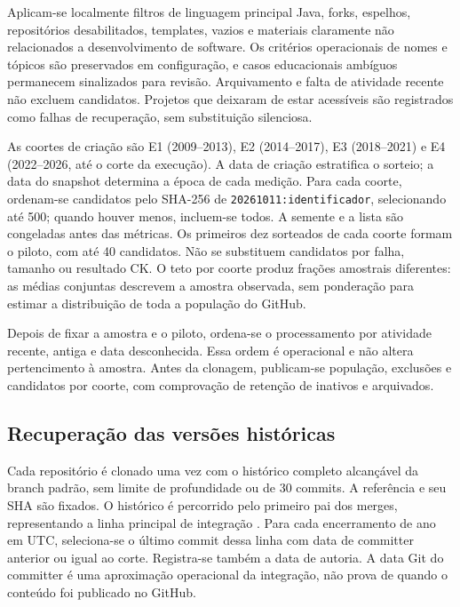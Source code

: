 Aplicam-se localmente filtros de linguagem principal Java, forks, espelhos, repositórios desabilitados, templates, vazios e materiais claramente não relacionados a desenvolvimento de software. Os critérios operacionais de nomes e tópicos são preservados em configuração, e casos educacionais ambíguos permanecem sinalizados para revisão. Arquivamento e falta de atividade recente não excluem candidatos. Projetos que deixaram de estar acessíveis são registrados como falhas de recuperação, sem substituição silenciosa.

As coortes de criação são E1 (2009--2013), E2 (2014--2017), E3 (2018--2021) e E4 (2022--2026, até o corte da execução). A data de criação estratifica o sorteio; a data do snapshot determina a época de cada medição. Para cada coorte, ordenam-se candidatos pelo SHA-256 de \texttt{20261011:identificador}, selecionando até 500; quando houver menos, incluem-se todos. A semente e a lista são congeladas antes das métricas. Os primeiros dez sorteados de cada coorte formam o piloto, com até 40 candidatos. Não se substituem candidatos por falha, tamanho ou resultado CK. O teto por coorte produz frações amostrais diferentes: as médias conjuntas descrevem a amostra observada, sem ponderação para estimar a distribuição de toda a população do GitHub.

Depois de fixar a amostra e o piloto, ordena-se o processamento por atividade recente, antiga e data desconhecida. Essa ordem é operacional e não altera pertencimento à amostra. Antes da clonagem, publicam-se população, exclusões e candidatos por coorte, com comprovação de retenção de inativos e arquivados.

\subsection{Recuperação das versões históricas}
\label{subsec:snapshots}

Cada repositório é clonado uma vez com o histórico completo alcançável da branch padrão, sem limite de profundidade ou de 30 commits. A referência e seu SHA são fixados. O histórico é percorrido pelo primeiro pai dos merges, representando a linha principal de integração \cite{git:firstparent}. Para cada encerramento de ano em UTC, seleciona-se o último commit dessa linha com data de committer anterior ou igual ao corte. Registra-se também a data de autoria. A data Git do committer é uma aproximação operacional da integração, não prova de quando o conteúdo foi publicado no GitHub.

